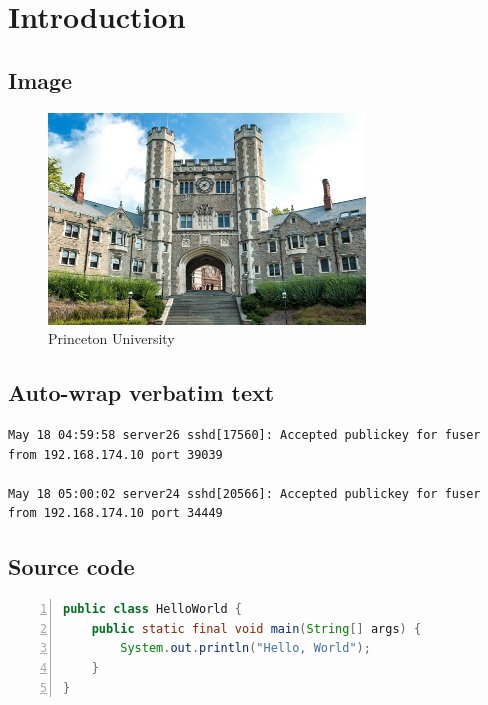 \chapter{Introduction}

\section{Image}

\begin{figure}[h]
	\centering
	\includegraphics[width=0.75\textwidth]{figures/princeton}
	\caption{Princeton University}
	\label{fig:princeton}
\end{figure}

\section{Auto-wrap verbatim text}
\begin{lstlisting}
May 18 04:59:58 server26 sshd[17560]: Accepted publickey for fuser from 192.168.174.10 port 39039

May 18 05:00:02 server24 sshd[20566]: Accepted publickey for fuser from 192.168.174.10 port 34449
\end{lstlisting}

\section{Source code}
\begin{lstlisting}[language=Java, numbers=left]
public class HelloWorld {
	public static final void main(String[] args) {
		System.out.println("Hello, World");
	}
}
\end{lstlisting}

